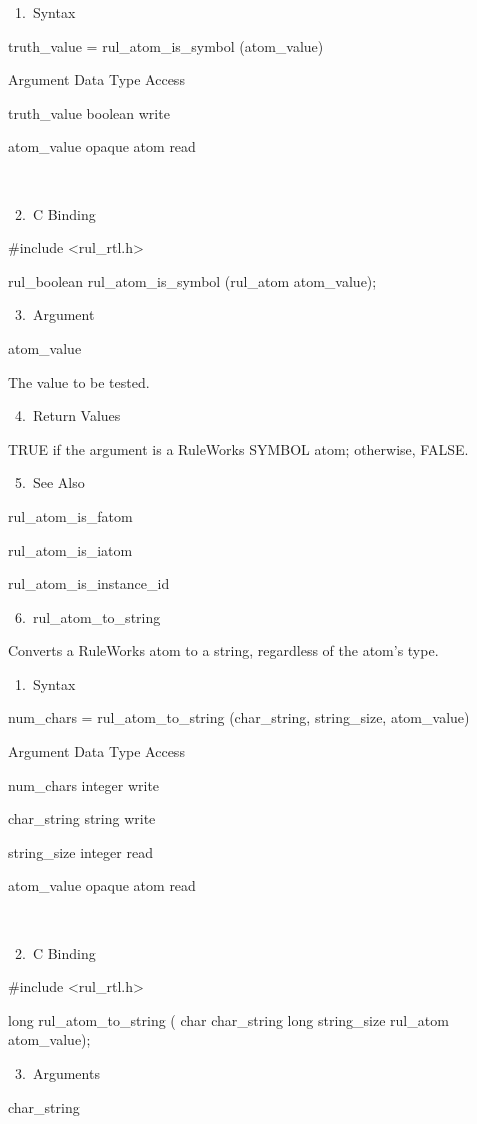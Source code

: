        1. Syntax

          truth_value = rul_atom_is_symbol
          (atom_value)

          Argument  Data Type    Access

          truth_value  boolean    write

          atom_value  opaque atom   read

           

       2. C Binding

          #include <rul_rtl.h>

          rul_boolean rul_atom_is_symbol
          (rul_atom atom_value);

       3. Argument

          atom_value

          The value to be tested.

       4. Return Values

          TRUE if the argument is a RuleWorks
          SYMBOL atom; otherwise, FALSE.

       5. See Also

    rul_atom_is_fatom

    rul_atom_is_iatom

    rul_atom_is_instance_id

 6. rul_atom_to_string

    Converts a RuleWorks atom to a string,
    regardless of the atom's type.

       1. Syntax

          num_chars = rul_atom_to_string
          (char_string, string_size,
          atom_value)

          Argument  Data Type    Access

          num_chars  integer    write

          char_string  string    write

          string_size  integer    read

          atom_value  opaque atom   read

           

       2. C Binding

          #include <rul_rtl.h>

          long rul_atom_to_string (
          char  char_string
          long string_size
          rul_atom atom_value);

       3. Arguments

          char_string

